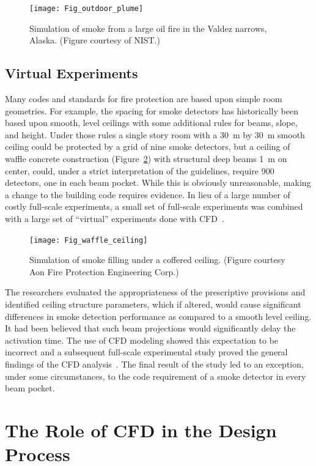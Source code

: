 \documentclass[graybox]{svmult}
\begin{document}
\begin{figure}[ht]
\texttt{[image: Fig\_outdoor\_plume]}
\caption{Simulation of smoke from a large oil fire in the Valdez narrows, Alaska. (Figure courtesy of NIST.)}
\label{ALOFT}
\end{figure}



\subsection{Virtual Experiments}

Many codes and standards for fire protection are based upon simple room geometries. For example, the spacing for smoke detectors has historically been based upon smooth, level ceilings with some additional rules for beams, slope, and height.  Under those rules a single story room with a 30~m by 30~m smooth ceiling could be protected by a grid of nine smoke detectors, but a ceiling of waffle concrete construction (Figure~\ref{waffle_ceiling}) with structural deep beams 1~m on center, could, under a strict interpretation of the guidelines, require 900 detectors, one in each beam pocket. While this is obviously unreasonable, making a change to the building code requires evidence. In lieu of a large number of costly full-scale experiments, a small set of full-scale experiments was combined with a large set of ``virtual'' experiments done with CFD~\cite{O'Connor:NFPRF,Mealy:NFPRF}.
\begin{figure}[ht]
\texttt{[image: Fig\_waffle\_ceiling]}
\caption{Simulation of smoke filling under a coffered ceiling. (Figure courtesy Aon Fire Protection Engineering Corp.)}
\label{waffle_ceiling}
\end{figure}
The researchers evaluated the appropriateness of the prescriptive provisions and identified ceiling structure parameters, which if altered, would cause significant differences in smoke detection performance as compared to a smooth level ceiling. It had been believed that such beam projections would significantly delay the activation time. The use of CFD modeling showed this expectation to be incorrect and a subsequent full-scale experimental study proved the general findings of the CFD analysis~\cite{Gottuk:2008}. The final result of the study led to an exception, under some circumstances, to the code requirement of a smoke detector in every beam pocket.


\section{The Role of CFD in the Design Process}
\end{document}
